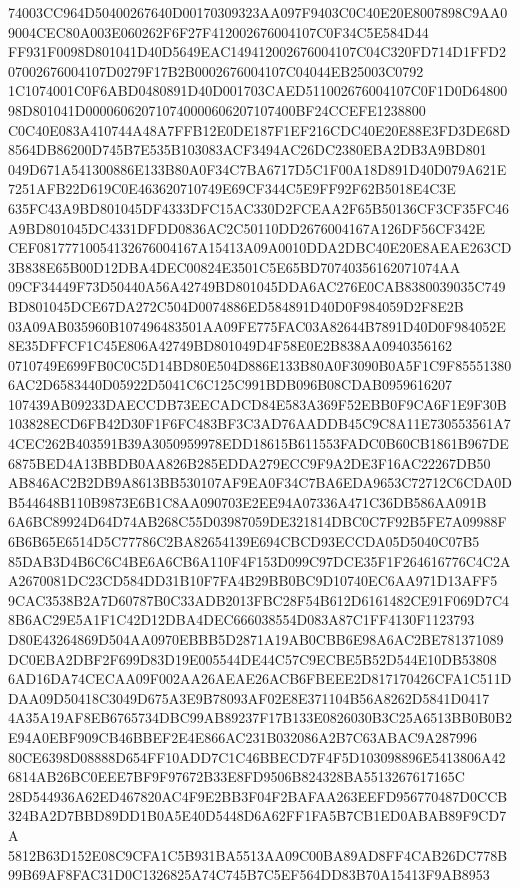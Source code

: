 \documentclass[UTF8,fontset=fandol,zihao=-4,a4paper]{ctexart}
\begin{document}
{{74003CC964D50400267640D00170309323AA097F9403C0C40E20E8007898C9AA09004CEC80A003E060262F6F27F412002676004107C0F34C5E584D44
FF931F0098D801041D40D5649EAC149412002676004107C04C320FD714D1FFD207002676004107D0279F17B2B0002676004107C04044EB25003C0792
1C1074001C0F6ABD0480891D40D001703CAED511002676004107C0F1D0D6480098D801041D000060620710740000606207107400BF24CCEFE1238800
C0C40E083A410744A48A7FFB12E0DE187F1EF216CDC40E20E88E3FD3DE68D8564DB86200D745B7E535B103083ACF3494AC26DC2380EBA2DB3A9BD801
049D671A541300886E133B80A0F34C7BA6717D5C1F00A18D891D40D079A621E7251AFB22D619C0E463620710749E69CF344C5E9FF92F62B5018E4C3E
635FC43A9BD801045DF4333DFC15AC330D2FCEAA2F65B50136CF3CF35FC46A9BD801045DC4331DFDD0836AC2C50110DD2676004167A126DF56CF342E
CEF08177710054132676004167A15413A09A0010DDA2DBC40E20E8AEAE263CD3B838E65B00D12DBA4DEC00824E3501C5E65BD70740356162071074AA
09CF34449F73D50440A56A42749BD801045DDA6AC276E0CAB8380039035C749BD801045DCE67DA272C504D0074886ED584891D40D0F984059D2F8E2B
03A09AB035960B107496483501AA09FE775FAC03A82644B7891D40D0F984052E8E35DFFCF1C45E806A42749BD801049D4F58E0E2B838AA0940356162
0710749E699FB0C0C5D14BD80E504D886E133B80A0F3090B0A5F1C9F855513806AC2D6583440D05922D5041C6C125C991BDB096B08CDAB0959616207
107439AB09233DAECCDB73EECADCD84E583A369F52EBB0F9CA6F1E9F30B103828ECD6FB42D30F1F6FC483BF3C3AD76AADDB45C9C8A11E730553561A7
4CEC262B403591B39A3050959978EDD18615B611553FADC0B60CB1861B967DE6875BED4A13BBDB0AA826B285EDDA279ECC9F9A2DE3F16AC22267DB50
AB846AC2B2DB9A8613BB530107AF9EA0F34C7BA6EDA9653C72712C6CDA0DB544648B110B9873E6B1C8AA090703E2EE94A07336A471C36DB586AA091B
6A6BC89924D64D74AB268C55D03987059DE321814DBC0C7F92B5FE7A09988F6B6B65E6514D5C77786C2BA82654139E694CBCD93ECCDA05D5040C07B5
85DAB3D4B6C6C4BE6A6CB6A110F4F153D099C97DCE35F1F264616776C4C2AA2670081DC23CD584DD31B10F7FA4B29BB0BC9D10740EC6AA971D13AFF5
9CAC3538B2A7D60787B0C33ADB2013FBC28F54B612D6161482CE91F069D7C48B6AC29E5A1F1C42D12DBA4DEC666038554D083A87C1FF4130F1123793
D80E43264869D504AA0970EBBB5D2871A19AB0CBB6E98A6AC2BE781371089DC0EBA2DBF2F699D83D19E005544DE44C57C9ECBE5B52D544E10DB53808
6AD16DA74CECAA09F002AA26AEAE26ACB6FBEEE2D817170426CFA1C511DDAA09D50418C3049D675A3E9B78093AF02E8E371104B56A8262D5841D0417
4A35A19AF8EB6765734DBC99AB89237F17B133E0826030B3C25A6513BB0B0B2E94A0EBF909CB46BBEF2E4E866AC231B032086A2B7C63ABAC9A287996
80CE6398D08888D654FF10ADD7C1C46BBECD7F4F5D103098896E5413806A426814AB26BC0EEE7BF9F97672B33E8FD9506B824328BA5513267617165C
28D544936A62ED467820AC4F9E2BB3F04F2BAFAA263EEFD956770487D0CCB324BA2D7BBD89DD1B0A5E40D5448D6A62FF1FA5B7CB1ED0ABAB89F9CD7A
5812B63D152E08C9CFA1C5B931BA5513AA09C00BA89AD8FF4CAB26DC778B99B69AF8FAC31D0C1326825A74C745B7C5EF564DD83B70A15413F9AB8953
}}
\end{document}
